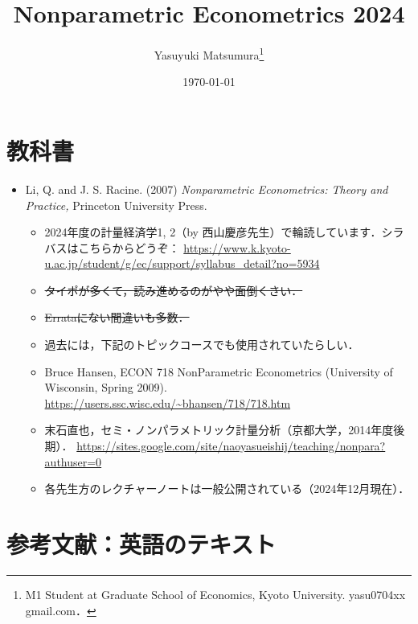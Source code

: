 \documentclass[a4paper,10pt]{jarticle}
\title{Nonparametric Econometrics 2024}
\author{Yasuyuki Matsumura\thanks{M1 Student at Graduate School of Economics, Kyoto University. yasu0704xx \text{@} gmail.com．}}
\date{\today} %
\begin{document}
\maketitle %

\section{教科書}
\begin{itemize}
  \item Li, Q. and J. S. Racine. (2007)
        \textit{Nonparametric Econometrics: Theory and Practice,} 
        Princeton University Press.

        \begin{itemize}
        \item 2024年度の計量経済学1, 2（by 西山慶彦先生）で輪読しています．シラバスはこちらからどうぞ：
              \url{https://www.k.kyoto-u.ac.jp/student/g/ec/support/syllabus_detail?no=5934}
        \item \sout{タイポが多くて，読み進めるのがやや面倒くさい．}
        \item \sout{Errataにない間違いも多数．}
        \item 過去には，下記のトピックコースでも使用されていたらしい．
        \item Bruce Hansen, ECON 718 NonParametric Econometrics (University of Wisconsin, Spring 2009).
              \url{https://users.ssc.wisc.edu/~bhansen/718/718.htm}
        \item 末石直也，セミ・ノンパラメトリック計量分析（京都大学，2014年度後期）．
              \url{https://sites.google.com/site/naoyasueishij/teaching/nonpara?authuser=0}
        \item 各先生方のレクチャーノートは一般公開されている（2024年12月現在）．
        \end{itemize}
  
\end{itemize}

\section{参考文献：英語のテキスト}
\end{document}
